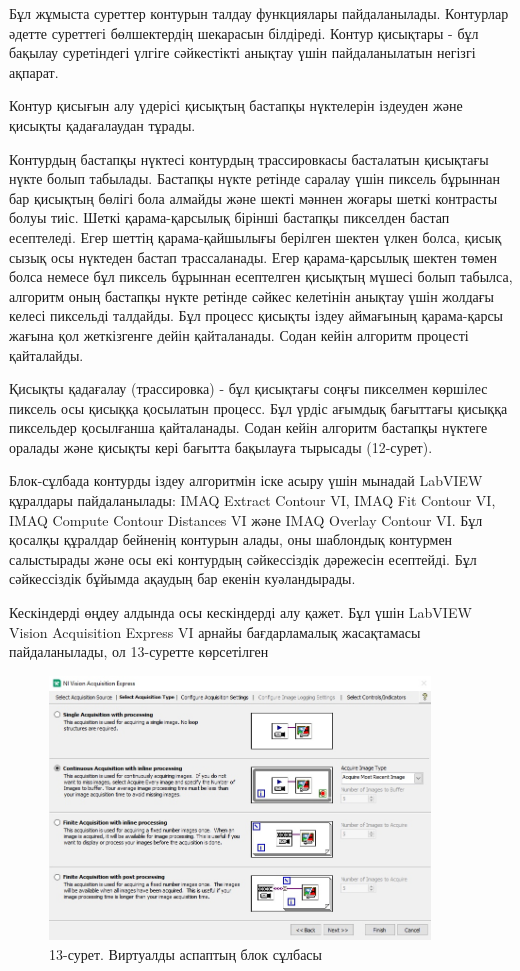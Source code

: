 \begin{multicols}{2}
Бұл жұмыста суреттер контурын талдау функциялары пайдаланылады.
Контурлар әдетте суреттегі бөлшектердің шекарасын білдіреді. Контур
қисықтары - бұл бақылау суретіндегі үлгіге сәйкестікті анықтау үшін
пайдаланылатын негізгі ақпарат.

Контур қисығын алу үдерісі қисықтың бастапқы нүктелерін іздеуден және
қисықты қадағалаудан тұрады.

Контурдың бастапқы нүктесі контурдың трассировкасы басталатын қисықтағы
нүкте болып табылады. Бастапқы нүкте ретінде саралау үшін пиксель
бұрыннан бар қисықтың бөлігі бола алмайды және шекті мәннен жоғары шеткі
контрасты болуы тиіс. Шеткі қарама-қарсылық бірінші бастапқы пикселден
бастап есептеледі. Егер шеттің қарама-қайшылығы берілген шектен үлкен
болса, қисық сызық осы нүктеден бастап трассаланады. Егер
қарама-қарсылық шектен төмен болса немесе бұл пиксель бұрыннан
есептелген қисықтың мүшесі болып табылса, алгоритм оның бастапқы нүкте
ретінде сәйкес келетінін анықтау үшін жолдағы келесі пиксельді талдайды.
Бұл процесс қисықты іздеу аймағының қарама-қарсы жағына қол жеткізгенге
дейін қайталанады. Содан кейін алгоритм процесті қайталайды.

Қисықты қадағалау (трассировка) - бұл қисықтағы соңғы пикселмен көршілес
пиксель осы қисыққа қосылатын процесс. Бұл үрдіс ағымдық бағыттағы
қисыққа пиксельдер қосылғанша қайталанады. Содан кейін алгоритм бастапқы
нүктеге оралады және қисықты кері бағытта бақылауға тырысады (12-сурет).

Блок-сұлбада контурды іздеу алгоритмін іске асыру үшін мынадай LabVIEW
құралдары пайдаланылады: IMAQ Extract Contour VI, IMAQ Fit Contour VI,
IMAQ Compute Contour Distances VI және IMAQ Overlay Contour VI. Бұл
қосалқы құралдар бейненің контурын алады, оны шаблондық контурмен
салыстырады және осы екі контурдың сәйкессіздік дәрежесін есептейді. Бұл
сәйкессіздік бұйымда ақаудың бар екенін куәландырады.

Кескіндерді өңдеу алдында осы кескіндерді алу қажет. Бұл үшін LabVIEW
Vision Acquisition Express VI арнайы бағдарламалық жасақтамасы
пайдаланылады, ол 13-суретте көрсетілген
\end{multicols}

\begin{figure}[H]
	\centering
	\includegraphics[width=0.9\textwidth]{media/ict2/image181}
	\caption*{13-сурет. Виртуалды аспаптың блок сұлбасы}
\end{figure}

